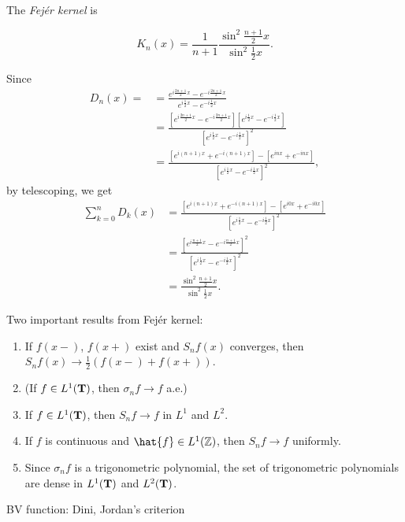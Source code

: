 \documentclass{../../large}
\begin{document}
\begin{prb}
The \emph{Fej\'er kernel} is

\begin{parts}
\item
\[K_n(x)=\frac1{n+1}\frac{\sin^2\frac{n+1}2x}{\sin^2\frac12x}.\]
\end{parts}
\end{prb}
\begin{pf}
Since
\begin{align*}
D_n(x)=
&=\frac{e^{i\frac{2n+1}2x}-e^{-i\frac{2n+1}2x}}{e^{i\frac12x}-e^{-i\frac12x}}\\
&=\frac{[e^{i\frac{2n+1}2x}-e^{-i\frac{2n+1}2x}][e^{i\frac12x}-e^{-i\frac12x}]}{[e^{i\frac12x}-e^{-i\frac12x}]^2}\\
&=\frac{[e^{i(n+1)x}+e^{-i(n+1)x}]-[e^{inx}+e^{-inx}]}{[e^{i\frac12x}-e^{-i\frac12x}]^2},
\end{align*}
by telescoping, we get
\begin{align*}
\sum_{k=0}^nD_k(x)
&=\frac{[e^{i(n+1)x}+e^{-i(n+1)x}]-[e^{i0x}+e^{-i0x}]}{[e^{i\frac12x}-e^{-i\frac12x}]^2}\\
&=\frac{[e^{i\frac{n+1}2x}-e^{-i\frac{n+1}2x}]^2}{[e^{i\frac12x}-e^{-i\frac12x}]^2}\\
&=\frac{\sin^2\frac{n+1}2x}{\sin^2\frac12x}.
\end{align*}
\end{pf}

Two important results from Fej\'er kernel:
\begin{enumerate}
\item If $f(x-)$, $f(x+)$ exist and $S_nf(x)$ converges, then $S_nf(x)\to\frac12(f(x-)+f(x+))$.
\item (If $f\in L^1(\mathbf{T})$, then $\sigma_nf\to f$ a.e.)

\item If $f\in L^1(\mathbf{T})$, then $S_nf\to f$ in $L^1$ and $L^2$.
\item If $f$ is continuous and $\hat{f}\in L^1(\Z)$, then $S_nf\to f$ uniformly.
\item Since $\sigma_nf$ is a trigonometric polynomial, the set of trigonometric polynomials are dense in $L^1(\mathbf{T})$ and $L^2(\mathbf{T})$.
\end{enumerate}


BV function: Dini, Jordan's criterion
\begin{prb}
\end{prb}
\end{document}
